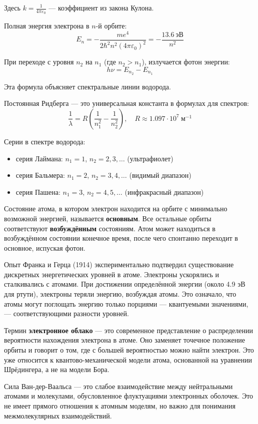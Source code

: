 Здесь $k = \frac{1}{4\pi\varepsilon_0}$ — коэффициент из закона Кулона.

Полная энергия электрона в $n$-й орбите:
\[
E_n = - \frac{m e^4}{2 \hbar^2 n^2 (4 \pi \varepsilon_0)^2} = -\frac{13.6\ \text{эВ}}{n^2}
\]

При переходе с уровня $n_2$ на $n_1$ (где $n_2 > n_1$), излучается фотон энергии:
\[
h \nu = E_{n_2} - E_{n_1}
\]

Эта формула объясняет спектральные линии водорода.

Постоянная Ридберга — это универсальная константа в формулах для спектров:
\[
\frac{1}{\lambda} = R \left( \frac{1}{n_1^2} - \frac{1}{n_2^2} \right), \quad R \approx 1.097 \cdot 10^7\ \text{м}^{-1}
\]

Серии в спектре водорода:

\begin{itemize}
    \item серия Лаймана: $n_1 = 1$, $n_2 = 2, 3, \ldots$ (ультрафиолет)  
    \item серия Бальмера: $n_1 = 2$, $n_2 = 3, 4, \ldots$ (видимый диапазон)  
    \item серия Пашена: $n_1 = 3$, $n_2 = 4, 5, \ldots$ (инфракрасный диапазон)
\end{itemize}

Состояние атома, в котором электрон находится на орбите с минимально возможной энергией, называется \textbf{основным}. Все остальные орбиты соответствуют \textbf{возбуждённым} состояниям. Атом может находиться в возбуждённом состоянии конечное время, после чего спонтанно переходит в основное, испуская фотон.

Опыт Франка и Герца (1914) экспериментально подтвердил существование дискретных энергетических уровней в атоме. Электроны ускорялись и сталкивались с атомами. При достижении определённой энергии (около 4.9 эВ для ртути), электроны теряли энергию, возбуждая атомы. Это означало, что атомы могут поглощать энергию только порциями — квантуемыми значениями, — соответствующими разности уровней.

Термин \textbf{электронное облако} — это современное представление о распределении вероятности нахождения электрона в атоме. Оно заменяет точечное положение орбиты и говорит о том, где с большей вероятностью можно найти электрон. Это уже относится к квантово-механической модели атома, основанной на уравнении Шрёдингера, а не на модели Бора.

Сила Ван-дер-Ваальса — это слабое взаимодействие между нейтральными атомами и молекулами, обусловленное флуктуациями электронных оболочек. Это не имеет прямого отношения к атомным моделям, но важно для понимания межмолекулярных взаимодействий.
